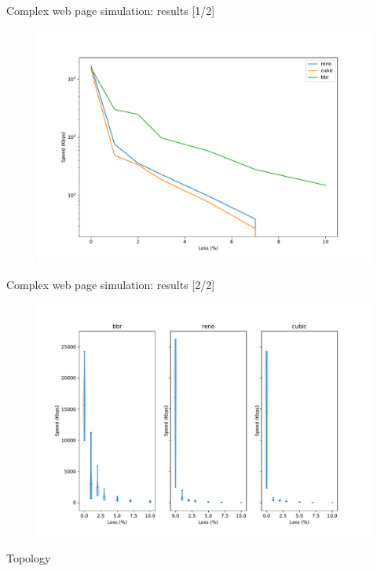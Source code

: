 \documentclass[13pt,aspectratio=43]{beamer}
\begin{document}
\begin{frame}{Complex web page simulation: results [1/2]}
  \begin{figure}
	  \includegraphics[width=\textwidth,height=\textheight,keepaspectratio]{../http_test/plot_log.pdf}
  \end{figure}
\end{frame}

\begin{frame}{Complex web page simulation: results [2/2]}
  \begin{figure}
	  \includegraphics[width=\textwidth,height=\textheight,keepaspectratio]{../http_test/violinplot.pdf}
  \end{figure}
\end{frame}



\begin{frame}{Topology}
\end{frame}
\end{document}
